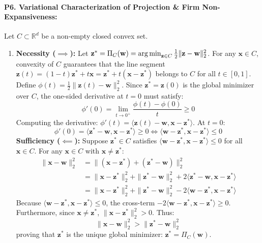 \paragraph{P6. Variational Characterization of Projection \& Firm Non-Expansiveness:}
Let $C \subset \mathbb{R}^d$ be a non-empty closed convex set.
\begin{enumerate}[label=(\alph*)]
    \item \textbf{Necessity ($\implies$):} Let $\mathbf{z}^* = \Pi_C(\mathbf{w}) = \operatorname*{arg\,min}_{\mathbf{z} \in C} \frac{1}{2}\|\mathbf{z} - \mathbf{w}\|_2^2$. For any $\mathbf{x} \in C$, convexity of $C$ guarantees that the line segment $\mathbf{z}(t) = (1 - t)\mathbf{z}^* + t\mathbf{x} = \mathbf{z}^* + t(\mathbf{x} - \mathbf{z}^*)$ belongs to $C$ for all $t \in [0, 1]$.
    Define $\phi(t) = \frac{1}{2}\|\mathbf{z}(t) - \mathbf{w}\|_2^2$. Since $\mathbf{z}^* = \mathbf{z}(0)$ is the global minimizer over $C$, the one-sided derivative at $t=0$ must satisfy:
    \begin{equation*}
    \phi'(0) = \lim_{t \to 0^+} \frac{\phi(t) - \phi(0)}{t} \ge 0
    \end{equation*}
    Computing the derivative: $\phi'(t) = \langle \mathbf{z}(t) - \mathbf{w}, \mathbf{x} - \mathbf{z}^* \rangle$. At $t = 0$:
    \begin{equation*}
    \phi'(0) = \langle \mathbf{z}^* - \mathbf{w}, \mathbf{x} - \mathbf{z}^* \rangle \ge 0 \iff \langle \mathbf{w} - \mathbf{z}^*, \mathbf{x} - \mathbf{z}^* \rangle \le 0
    \end{equation*}
    \textbf{Sufficiency ($\impliedby$):} Suppose $\mathbf{z}^* \in C$ satisfies $\langle \mathbf{w} - \mathbf{z}^*, \mathbf{x} - \mathbf{z}^* \rangle \le 0$ for all $\mathbf{x} \in C$. For any $\mathbf{x} \in C$ with $\mathbf{x} \ne \mathbf{z}^*$:
    \begin{align*}
    \|\mathbf{x} - \mathbf{w}\|_2^2 &= \|(\mathbf{x} - \mathbf{z}^*) + (\mathbf{z}^* - \mathbf{w})\|_2^2 \\
    &= \|\mathbf{x} - \mathbf{z}^*\|_2^2 + \|\mathbf{z}^* - \mathbf{w}\|_2^2 + 2\langle \mathbf{z}^* - \mathbf{w}, \mathbf{x} - \mathbf{z}^* \rangle \\
    &= \|\mathbf{x} - \mathbf{z}^*\|_2^2 + \|\mathbf{z}^* - \mathbf{w}\|_2^2 - 2\langle \mathbf{w} - \mathbf{z}^*, \mathbf{x} - \mathbf{z}^* \rangle
    \end{align*}
    Because $\langle \mathbf{w} - \mathbf{z}^*, \mathbf{x} - \mathbf{z}^* \rangle \le 0$, the cross-term $-2\langle \mathbf{w} - \mathbf{z}^*, \mathbf{x} - \mathbf{z}^* \rangle \ge 0$. Furthermore, since $\mathbf{x} \ne \mathbf{z}^*$, $\|\mathbf{x} - \mathbf{z}^*\|_2^2 > 0$. Thus:
    \begin{equation*}
    \|\mathbf{x} - \mathbf{w}\|_2^2 > \|\mathbf{z}^* - \mathbf{w}\|_2^2
    \end{equation*}
    proving that $\mathbf{z}^*$ is the unique global minimizer: $\mathbf{z}^* = \Pi_C(\mathbf{w})$.
    

\end{enumerate}
